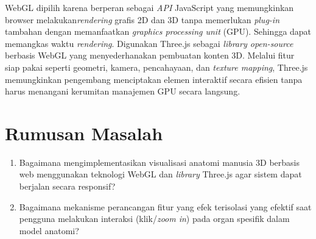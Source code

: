 \documentclass[a4paper,twoside]{article}
\begin{document}
        WebGL dipilih karena berperan sebagai \textit{API} JavaScript yang memungkinkan browser melakukan\textit{rendering} grafis 2D dan 3D tanpa memerlukan \textit{plug-in} tambahan dengan memanfaatkan \textit{graphics processing unit} (GPU). Sehingga dapat memangkas waktu \textit{rendering}. Digunakan Three.js sebagai \textit{library open-source} berbasis WebGL yang menyederhanakan pembuatan konten 3D. Melalui fitur siap pakai seperti geometri, kamera, pencahayaan, dan \textit{texture mapping}, Three.js memungkinkan pengembang menciptakan elemen interaktif secara efisien tanpa harus menangani kerumitan manajemen GPU secara langsung.

        
         
\section{Rumusan Masalah}
   \begin{enumerate}
        \item Bagaimana mengimplementasikan visualisasi anatomi manusia 3D berbasis web menggunakan teknologi WebGL dan \textit{library} Three.js agar sistem dapat berjalan secara responsif?
        \item Bagaimana mekanisme perancangan fitur yang efek terisolasi yang efektif saat pengguna melakukan interaksi (klik/\textit{zoom in}) pada organ spesifik dalam model anatomi?
    \end{enumerate}
\end{document}
